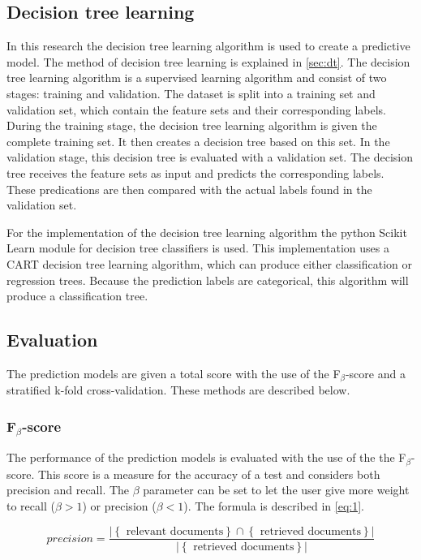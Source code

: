 \subsection{Decision tree learning}
In this research the decision tree learning algorithm is used to create a predictive model. The method of decision tree learning is explained in \autoref{sec:dt}. 
The decision tree learning algorithm is a supervised learning algorithm and consist of two stages: training and validation. The dataset is split into a training set and validation set, which contain the feature sets and their corresponding labels. During the training stage, the decision tree learning algorithm is given the complete training set. It then creates a decision tree based on this set. In the validation stage, this decision tree is evaluated with a validation set. The decision tree receives the feature sets as input and predicts the corresponding labels. These predications are then compared with the actual labels found in the validation set. 

For the implementation of the decision tree learning algorithm the python Scikit Learn \cite{scikit-learn} module for decision tree classifiers is used. This implementation uses a CART\cite{breiman1983cart} decision tree learning algorithm, which can produce either classification or regression trees. Because the prediction labels are categorical, this algorithm will produce a classification tree.

\subsection{Evaluation}\label{sec:eval}
The prediction models are given a total score with the use of the F$_\beta$-score and a stratified k-fold cross-validation. These methods are described below.

\subsubsection{F$_\beta$-score}\label{sec:fbeta}
The performance of the prediction models is evaluated with the use of the the F$_\beta$-score. This score is a measure for the accuracy of a test and considers both precision and recall. The $\beta$ parameter can be set to let the user give more weight to recall ($\beta > 1 $) or precision ($\beta < 1 $). The formula is described in \autoref{eq:1}.

\begin{equation}\label{eq:1}
precision =  \frac{ \left\vert{\left\{ \text{ relevant documents} \right\} \cap \left\{ \text{ retrieved documents} \right\}}\right\vert }{ \left\vert{\left\{ \text{ retrieved documents} \right\}}\right\vert}
\end{equation}

